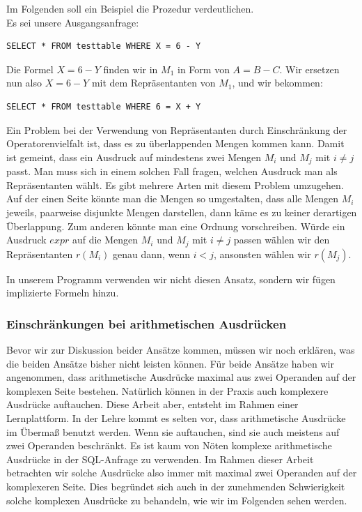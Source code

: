 Im Folgenden soll ein Beispiel die Prozedur verdeutlichen.\\

Es sei unsere Ausgangsanfrage: \begin{verbatim}SELECT * FROM testtable WHERE X = 6 - Y\end{verbatim}

Die Formel $X=6-Y$ finden wir in $M_1$ in Form von $A=B-C$. Wir ersetzen nun also $X=6-Y$ mit dem Repräsentanten von $M_1$, und wir bekommen: \begin{verbatim}SELECT * FROM testtable WHERE 6 = X + Y\end{verbatim}

Ein Problem bei der Verwendung von Repräsentanten durch Einschränkung der Operatorenvielfalt ist, dass es zu überlappenden Mengen kommen kann. Damit ist gemeint, dass ein Ausdruck auf mindestens zwei Mengen $M_i$ und $M_j$ mit $i\neq j$ passt. Man muss sich in einem solchen Fall fragen, welchen Ausdruck man als Repräsentanten wählt. Es gibt mehrere Arten mit diesem Problem umzugehen. Auf der einen Seite könnte man die Mengen so umgestalten, dass alle Mengen $M_i$ jeweils, paarweise disjunkte Mengen darstellen, dann käme es zu keiner derartigen Überlappung. Zum anderen könnte man eine Ordnung vorschreiben. Würde ein Ausdruck $expr$ auf die Mengen $M_i$ und $M_j$ mit $i\neq j$ passen wählen wir den Repräsentanten $r(M_i)$ genau dann, wenn $i < j$, ansonsten wählen wir $r(M_j)$.

In unserem Programm verwenden wir nicht diesen Ansatz, sondern wir fügen implizierte Formeln hinzu.

\subsubsection{Einschränkungen bei arithmetischen Ausdrücken}
\label{subsubsec:arithmetic}

Bevor wir zur Diskussion beider Ansätze kommen, müssen wir noch erklären, was die beiden Ansätze bisher nicht leisten können. Für beide Ansätze haben wir angenommen, dass arithmetische Ausdrücke maximal aus zwei Operanden auf der komplexen Seite bestehen. Natürlich können in der Praxis auch komplexere Ausdrücke auftauchen. Diese Arbeit aber, entsteht im Rahmen einer Lernplattform. In der Lehre kommt es selten vor, dass arithmetische Ausdrücke im Übermaß benutzt werden. Wenn sie auftauchen, sind sie auch meistens auf zwei Operanden beschränkt. Es ist kaum von Nöten komplexe arithmetische Ausdrücke in der SQL-Anfrage zu verwenden. Im Rahmen dieser Arbeit betrachten wir solche Ausdrücke also immer mit maximal zwei Operanden auf der komplexeren Seite. Dies begründet sich auch in der zunehmenden Schwierigkeit solche komplexen Ausdrücke zu behandeln, wie wir im Folgenden sehen werden.

